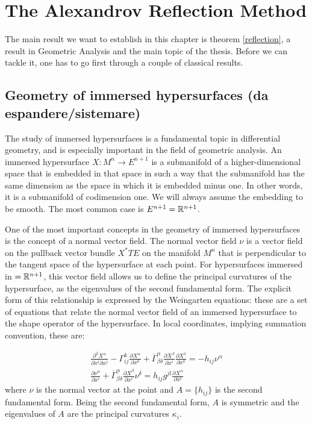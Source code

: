 \chapter{The Alexandrov Reflection Method}

The main result we want to establish in this chapter is theorem \ref{reflection}, a result in Geometric Analysis and the main topic of the thesis. Before we can tackle it, one has to go first through a couple of classical results. 

\section{Geometry of immersed hypersurfaces (da espandere/sistemare)}


The study of immersed hypersurfaces is a fundamental topic in differential geometry, and is especially important in the field of geometric analysis. An immersed hypersurface $X: M^n \rightarrow E^{n+1}$ is a submanifold of a higher-dimensional space that is embedded in that space in such a way that the submanifold has the same dimension as the space in which it is embedded minus one. In other words, it is a submanifold of codimension one. We will always assume the embedding to be smooth. The most common case is $E^{n+1}=\mathbb{R}^{n+1}$. 

One of the most important concepts in the geometry of immersed hypersurfaces is the concept of a normal vector field. The normal vector field $\nu$ is a vector field on the pullback vector bundle $X^* TE$ on the manifold $M^n$ that is perpendicular to the tangent space of the hypersurface at each point. For hypersurfaces immersed in $=\mathbb{R}^{n+1}$, this vector field allows us to define the principal curvatures of the hypersurface, as the eigenvalues of the second fundamental form. The explicit form of this relationship is expressed by the Weingarten equations: these are a set of equations that relate the normal vector field of an immersed hypersurface to the shape operator of the hypersurface. In local coordinates, implying summation convention, these are:

\begin{align}
	\label{Weingarten1} \frac{\partial^2 X^\alpha}{\partial x^i \partial x^j} - \Gamma^k_{ij}\frac{\partial X^\alpha}{\partial x^k}+\overline{\Gamma}^\alpha_{\beta \delta}\frac{\partial X^\beta}{\partial x^i}\frac{\partial X^\delta}{\partial x^k}=-h_{ij}\nu^\alpha \\
	\label{Weingarten2} \frac{\partial \nu^\alpha}{\partial x^i}+\overline{\Gamma}^\alpha_{\beta \delta}\frac{\partial X^\beta}{\partial x^i} \nu^\delta = h_{ij}g^{jl}\frac{\partial X^\alpha}{\partial x^l}
\end{align}
where $\nu$ is the normal vector at the point and $A=\{h_{ij}\}$ is the second fundamental form. Being the second fundamental form, $A$ is symmetric and the eigenvalues of $A$ are the principal curvatures $\kappa_i$. 

